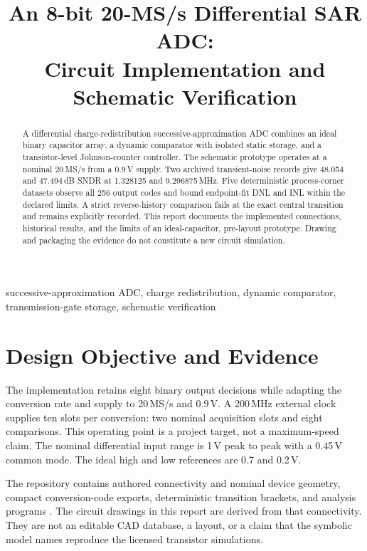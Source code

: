 \documentclass[10pt,conference,letterpaper]{IEEEtran}
\title{An 8-bit 20-MS/s Differential SAR ADC:\\Circuit Implementation and Schematic Verification}
\author{\IEEEauthorblockN{SAR ADC Project}\IEEEauthorblockA{Design and verification report}}
\begin{document}
\raggedbottom
\maketitle
\begin{abstract}
A differential charge-redistribution successive-approximation ADC combines an ideal binary capacitor array, a dynamic comparator with isolated static storage, and a transistor-level Johnson-counter controller. The schematic prototype operates at a nominal 20\,MS/s from a 0.9\,V supply. Two archived transient-noise records give 48.054 and 47.494\,dB SNDR at 1.328125 and 9.296875\,MHz. Five deterministic process-corner datasets observe all 256 output codes and bound endpoint-fit DNL and INL within the declared limits. A strict reverse-history comparison fails at the exact central transition and remains explicitly recorded. This report documents the implemented connections, historical results, and the limits of an ideal-capacitor, pre-layout prototype. Drawing and packaging the evidence do not constitute a new circuit simulation.
\end{abstract}
\begin{IEEEkeywords}
successive-approximation ADC, charge redistribution, dynamic comparator, transmission-gate storage, schematic verification
\end{IEEEkeywords}

\section{Design Objective and Evidence}
The implementation retains eight binary output decisions while adapting the conversion rate and supply to 20\,MS/s and 0.9\,V. A 200\,MHz external clock supplies ten slots per conversion: two nominal acquisition slots and eight comparisons. This operating point is a project target, not a maximum-speed claim. The nominal differential input range is 1\,V peak to peak with a 0.45\,V common mode. The ideal high and low references are 0.7 and 0.2\,V.

The repository contains authored connectivity and nominal device geometry, compact conversion-code exports, deterministic transition brackets, and analysis programs \cite{repo}. The circuit drawings in this report are derived from that connectivity. They are not an editable CAD database, a layout, or a claim that the symbolic model names reproduce the licensed transistor simulations.
\end{document}
